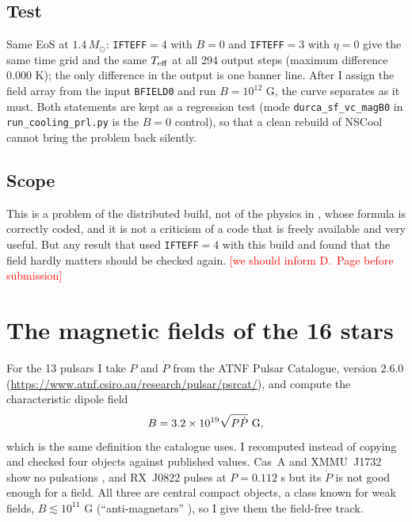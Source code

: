 \documentclass[11pt,a4paper]{article}
\newcommand{\fillin}[1]{\textcolor{red}{[#1]}}
\newcommand{\Teff}{T_{\rm eff}}
\newcommand{\Msun}{M_\odot}
\begin{document}
\subsection{Test}
Same EoS at $1.4\,\Msun$: \texttt{IFTEFF}$=4$ with $B=0$ and \texttt{IFTEFF}$=3$ with $\eta=0$ give the same time grid and the same $\Teff$ at all 294 output steps (maximum difference 0.000 K); the only difference in the output is one banner line. After I assign the field array from the input \texttt{BFIELD0} and run $B=10^{12}$ G, the curve separates as it must. Both statements are kept as a regression test (mode \texttt{durca\_sf\_vc\_magB0} in \texttt{run\_cooling\_prl.py} is the $B=0$ control), so that a clean rebuild of NSCool cannot bring the problem back silently.

\subsection{Scope}
This is a problem of the distributed build, not of the physics in \cite{PY2001}, whose formula is correctly coded, and it is not a criticism of a code that is freely available and very useful. But any result that used \texttt{IFTEFF}$=4$ with this build and found that the field hardly matters should be checked again. \fillin{we should inform D.~Page before submission}

\section{The magnetic fields of the 16 stars}\label{sec:fields}
For the 13 pulsars I take $P$ and $\dot P$ from the ATNF Pulsar Catalogue, version 2.6.0 \cite{ATNF2005} (\url{https://www.atnf.csiro.au/research/pulsar/psrcat/}), and compute the characteristic dipole field
\begin{equation}
B = 3.2\times10^{19}\sqrt{P\dot P}~{\rm G},
\end{equation}
which is the same definition the catalogue uses. I recomputed instead of copying and checked four objects against published values. Cas~A and XMMU~J1732 show no pulsations \cite{HoHeinke2009,Klochkov2013}, and RX~J0822 pulses at $P=0.112$ s but its $\dot P$ is not good enough for a field. All three are central compact objects, a class known for weak fields, $B\lesssim10^{11}$ G (``anti-magnetars'' \cite{DeLuca2017}), so I give them the field-free track.
\end{document}
